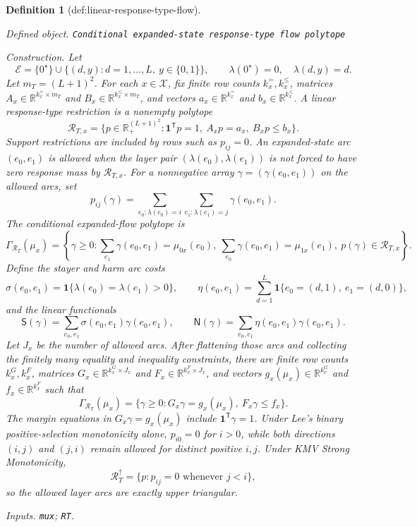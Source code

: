 \documentclass{article}
\newtheorem{definition}{Definition}
\begin{document}
\begin{definition}[def:linear-response-type-flow]\label{def:linear-response-type-flow}
\par\smallskip\noindent\emph{Defined object.} \texttt{Conditional expanded-\allowbreak{}state response-\allowbreak{}type flow polytope}
\par\smallskip\noindent\emph{Construction.} Let
\[\mathcal E=\{0^{\star}\}\cup\{(d,y):d=1,\ldots,L,\ y\in\{0,1\}\},\qquad
  \lambda(0^{\star})=0,\quad \lambda(d,y)=d.\]
Let \(m_T=(L+1)^2\).  For each \(x\in\mathcal X\), fix finite row counts \(k_x^=,k_x^{\le}\), matrices \(A_x\in\mathbb R^{k_x^=\times m_T}\) and \(B_x\in\mathbb R^{k_x^{\le}\times m_T}\), and vectors \(a_x\in\mathbb R^{k_x^=}\) and \(b_x\in\mathbb R^{k_x^{\le}}\).  A linear response-type restriction is a nonempty polytope
\[\mathcal R_{T,x}=\{p\in\mathbb R_+^{(L+1)^2}:\mathbf 1^{\mathsf T}p=1,\ A_xp=a_x,\ B_xp\le b_x\}.\]
Support restrictions are included by rows such as \(p_{ij}=0\).  An expanded-state arc \((e_0,e_1)\) is allowed when the layer pair \((\lambda(e_0),\lambda(e_1))\) is not forced to have zero response mass by \(\mathcal R_{T,x}\).  For a nonnegative array \(\gamma=(\gamma(e_0,e_1))\) on the allowed arcs, set
\[p_{ij}(\gamma)=\sum_{e_0:\lambda(e_0)=i}\sum_{e_1:\lambda(e_1)=j}\gamma(e_0,e_1).\]
The conditional expanded-flow polytope is
\[\Gamma_{\mathcal R_T}(\mu_x)=\left\{\gamma\ge0:
\sum_{e_1}\gamma(e_0,e_1)=\mu_{0x}(e_0),\ 
\sum_{e_0}\gamma(e_0,e_1)=\mu_{1x}(e_1),\ 
p(\gamma)\in\mathcal R_{T,x}\right\}.\]
Define the stayer and harm arc costs
\[\sigma(e_0,e_1)=\mathbf 1\{\lambda(e_0)=\lambda(e_1)>0\},\qquad
  \eta(e_0,e_1)=\sum_{d=1}^{L}\mathbf 1\{e_0=(d,1),\ e_1=(d,0)\},\]
and the linear functionals
\[\mathsf S(\gamma)=\sum_{e_0,e_1}\sigma(e_0,e_1)\gamma(e_0,e_1),\qquad
  \mathsf N(\gamma)=\sum_{e_0,e_1}\eta(e_0,e_1)\gamma(e_0,e_1).\]
Let \(J_x\) be the number of allowed arcs.  After flattening those arcs and collecting the finitely many equality and inequality constraints, there are finite row counts \(k_x^G,k_x^F\), matrices \(G_x\in\mathbb R^{k_x^G\times J_x}\) and \(F_x\in\mathbb R^{k_x^F\times J_x}\), and vectors \(g_x(\mu_x)\in\mathbb R^{k_x^G}\) and \(f_x\in\mathbb R^{k_x^F}\) such that
\[\Gamma_{\mathcal R_T}(\mu_x)=\{\gamma\ge0:G_x\gamma=g_x(\mu_x),\ F_x\gamma\le f_x\}.\]
The margin equations in \(G_x\gamma=g_x(\mu_x)\) include \(\mathbf 1^{\mathsf T}\gamma=1\).  Under Lee's binary positive-selection monotonicity alone, \(p_{i0}=0\) for \(i>0\), while both directions \((i,j)\) and \((j,i)\) remain allowed for distinct positive \(i,j\).  Under KMV Strong Monotonicity,
\[\mathcal R_T^{\uparrow}=\{p:p_{ij}=0\text{ whenever }j<i\},\]
so the allowed layer arcs are exactly upper triangular.
\par\smallskip\noindent\emph{Inputs.} \texttt{mux}; \texttt{RT}.
\end{definition}
\end{document}
